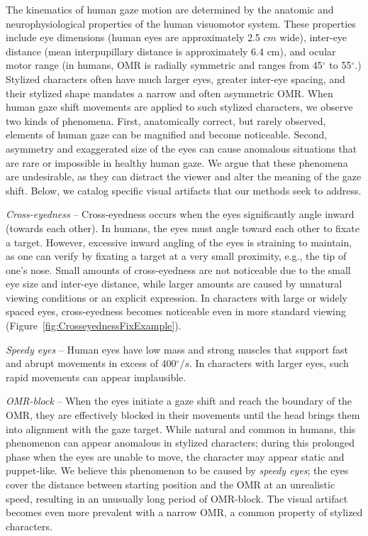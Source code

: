 The kinematics of human gaze motion are determined by the anatomic and neurophysiological properties of the human visuomotor system. These properties include eye dimensions (human eyes are approximately 2.5 $cm$ wide), inter-eye distance (mean interpupillary distance is approximately 6.4 cm), and ocular motor range (in humans, OMR is radially symmetric and ranges from 45$^\circ$ to 55$^\circ$.) Stylized characters often have much larger eyes, greater inter-eye spacing, and their stylized shape mandates a narrow and often asymmetric OMR. When human gaze shift movements are applied to such stylized characters, we observe two kinds of phenomena. First, anatomically correct, but rarely observed, elements of human gaze can be magnified and become noticeable. Second, asymmetry and exaggerated size of the eyes can cause anomalous situations that are rare or impossible in healthy human gaze. We argue that these phenomena are undesirable, as they can distract the viewer and alter the meaning of the gaze shift. Below, we catalog specific visual artifacts that our methods seek to address.

\noindent\emph{Cross-eyedness} -- Cross-eyedness occurs when the eyes significantly angle inward (towards each other). In humans, the eyes must angle toward each other to fixate a target. However, excessive inward angling of the eyes is straining to maintain, as one can verify by fixating a target at a very small proximity, e.g., the tip of one's nose. Small amounts of cross-eyedness are not noticeable due to the small eye size and inter-eye distance, while larger amounts are caused by unnatural viewing conditions or an explicit expression. In characters with large or widely spaced eyes, cross-eyedness becomes noticeable even in more standard viewing (Figure~\ref{fig:CrosseyednessFixExample}).

\noindent\emph{Speedy eyes} -- Human eyes have low mass and strong muscles that support fast and abrupt movements in excess of 400$^\circ/s$. In characters with larger eyes, such rapid movements can appear implausible.

\noindent\emph{OMR-block} --  When the eyes initiate a gaze shift and reach the boundary of the OMR, they are effectively blocked in their movements until the head brings them into alignment with the gaze target. While natural and common in humans, this phenomenon can appear anomalous in stylized characters; during this prolonged phase when the eyes are unable to move, the character may appear static and puppet-like. We believe this phenomenon to be caused by \textit{speedy eyes}; the eyes cover the distance between starting position and the OMR at an unrealistic speed, resulting in an unusually long period of OMR-block. The visual artifact becomes even more prevalent with a narrow OMR, a common property of stylized characters.

